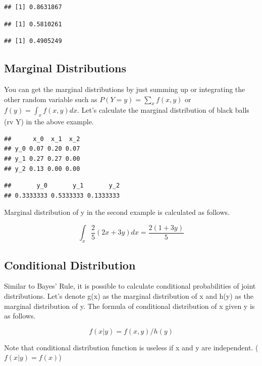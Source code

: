 \documentclass[]{book}
\theoremstyle{definition}
\theoremstyle{definition}
\theoremstyle{definition}
\theoremstyle{remark}
\begin{document}
\begin{verbatim}
## [1] 0.8631867
\end{verbatim}

\begin{verbatim}
## [1] 0.5810261
\end{verbatim}

\begin{verbatim}
## [1] 0.4905249
\end{verbatim}

\hypertarget{marginal-distributions}{%
\subsection{Marginal Distributions}\label{marginal-distributions}}

You can get the marginal distributions by just summing up or integrating
the other random variable such as \(P(Y=y) = \sum_x f(x,y)\) or
\(f(y) = \int_x f(x,y) dx\). Let's calculate the marginal distribution
of black balls (rv Y) in the above example.

\begin{verbatim}
##      x_0  x_1  x_2
## y_0 0.07 0.20 0.07
## y_1 0.27 0.27 0.00
## y_2 0.13 0.00 0.00
\end{verbatim}

\begin{verbatim}
##       y_0       y_1       y_2 
## 0.3333333 0.5333333 0.1333333
\end{verbatim}

Marginal distribution of y in the second example is calculated as
follows.

\[\int_x \dfrac{2}{5}(2x+3y) dx = \dfrac{2(1+3y)}{5}\]

\hypertarget{conditional-distribution-1}{%
\subsection{Conditional Distribution}\label{conditional-distribution-1}}

Similar to Bayes' Rule, it is possible to calculate conditional
probabilities of joint distributions. Let's denote g(x) as the marginal
distribution of x and h(y) as the marginal distribution of y. The
formula of conditional distribution of x given y is as follows.

\[f(x|y) = f(x,y)/h(y)\]

Note that conditional distribution function is useless if x and y are
independent. (\(f(x|y)=f(x)\))
\end{document}

